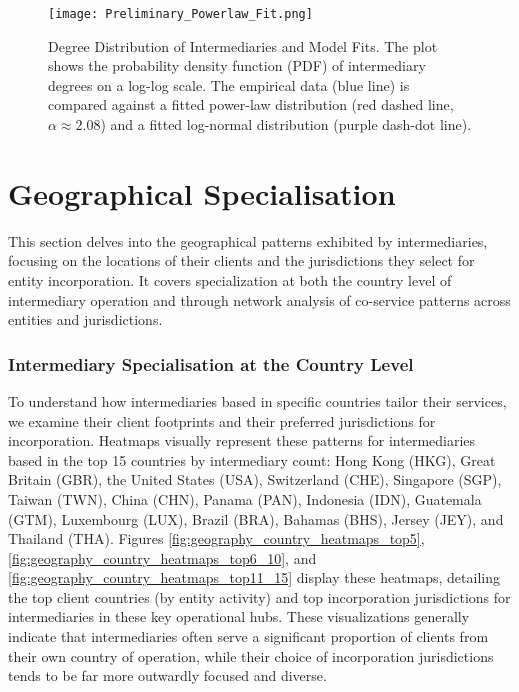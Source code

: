 \begin{figure}[htbp]
    \centering
    \texttt{[image: Preliminary\_Powerlaw\_Fit.png]}
    \caption{Degree Distribution of Intermediaries and Model Fits. The plot shows the probability density function (PDF) of intermediary degrees on a log-log scale. The empirical data (blue line) is compared against a fitted power-law distribution (red dashed line, $\alpha \approx 2.08$) and a fitted log-normal distribution (purple dash-dot line).}
    \label{fig:preliminary_powerlaw_fit}
\end{figure}


\section{Geographical Specialisation}
\label{sec:geographical_specialisation}

This section delves into the geographical patterns exhibited by intermediaries, focusing on the locations of their clients and the jurisdictions they select for entity incorporation. It covers specialization at both the country level of intermediary operation and through network analysis of co-service patterns across entities and jurisdictions.

\subsubsection{Intermediary Specialisation at the Country Level}
\label{subsubsec:intermediary_specialisation_country}

To understand how intermediaries based in specific countries tailor their services, we examine their client footprints and their preferred jurisdictions for incorporation. Heatmaps visually represent these patterns for intermediaries based in the top 15 countries by intermediary count: Hong Kong (HKG), Great Britain (GBR), the United States (USA), Switzerland (CHE), Singapore (SGP), Taiwan (TWN), China (CHN), Panama (PAN), Indonesia (IDN), Guatemala (GTM), Luxembourg (LUX), Brazil (BRA), Bahamas (BHS), Jersey (JEY), and Thailand (THA). Figures \ref{fig:geography_country_heatmaps_top5}, \ref{fig:geography_country_heatmaps_top6_10}, and \ref{fig:geography_country_heatmaps_top11_15} display these heatmaps, detailing the top client countries (by entity activity) and top incorporation jurisdictions for intermediaries in these key operational hubs. These visualizations generally indicate that intermediaries often serve a significant proportion of clients from their own country of operation, while their choice of incorporation jurisdictions tends to be far more outwardly focused and diverse.


